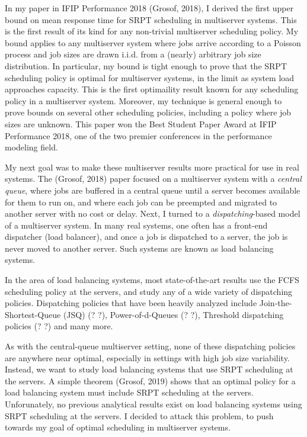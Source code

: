 \documentclass[12pt]{article}
\begin{document}
In my paper in IFIP Performance 2018 (Grosof, 2018),
I derived the first upper bound on mean response time for SRPT scheduling in multiserver systems.
This is the first result of its kind for any non-trivial multiserver scheduling policy.
My bound applies to any multiserver system
where jobs arrive according to a Poisson process
and job sizes are drawn i.i.d. from a (nearly) arbitrary job size distribution.
In particular, my bound is tight enough to prove that the SRPT scheduling policy
is optimal for multiserver systems,
in the limit as system load approaches capacity.
This is the first optimaility result known for any scheduling policy in a multiserver system.
Moreover, my technique is general enough to prove bounds on several other scheduling policies,
including a policy where job sizes are unknown.
This paper won the Best Student Paper Award at IFIP Performance 2018,
one of the two premier conferences in the performance modeling field.

My next goal was to make these multiserver results more practical for use in real systems.
The (Grosof, 2018) paper focused on a multiserver system with a \textit{central queue},
where jobs are buffered in a central queue until a server becomes available for them to run on,
and where each job can be preempted and migrated to another server with no cost or delay.
Next, I turned to a \textit{dispatching}-based model of a multiserver system.
In many real systems, one often has a front-end dispatcher (load balancer),
and once a job is dispatched to a server,
the job is never moved to another server.
Such systems are known as load balancing systems.

In the area of load balancing systems,
most state-of-the-art results use the FCFS scheduling policy at the servers,
and study any of a wide variety of dispatching policies.
Dispatching policies that have been heavily analyzed include Join-the-Shortest-Queue (JSQ) (? ?),
Power-of-d-Queues (? ?), Threshold dispatching policies (? ?) and many more.

As with the central-queue multiserver setting,
none of these dispatching policies are anywhere near optimal,
especially in settings with high job size variability.
Instead, we want to study load balancing systems that use SRPT scheduling at the servers.
A simple theorem (Grosof, 2019) shows that an optimal policy for a load balancing system
must include SRPT scheduling at the servers.
Unforunately, no previous analytical results exist
on load balancing systems using SRPT scheduling at the servers.
I decided to attack this problem,
to push towards my goal of optimal scheduling in multiserver systems.
\end{document}
